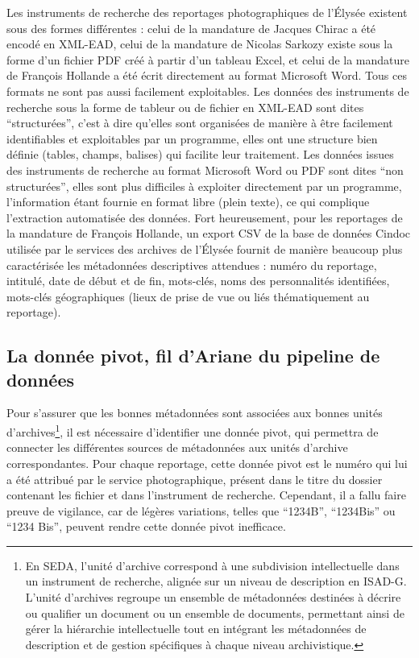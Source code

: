 Les instruments de recherche des reportages photographiques de l'Élysée existent sous des formes différentes : celui de la mandature de Jacques Chirac a été encodé en XML-EAD, celui de la mandature de Nicolas Sarkozy existe sous la forme d'un fichier PDF créé à partir d'un tableau Excel, et celui de la mandature de François Hollande a été écrit directement au format Microsoft Word. Tous ces formats ne sont pas aussi facilement exploitables. Les données des instruments de recherche sous la forme de tableur ou de fichier en XML-EAD sont dites \enquote{structurées}, c'est à dire qu'elles sont organisées de manière à être facilement identifiables et exploitables par un programme, elles ont une structure bien définie (tables, champs, balises) qui facilite leur traitement. Les données issues des instruments de recherche au format Microsoft Word ou PDF sont dites \enquote{non structurées}, elles sont plus difficiles à exploiter directement par un programme, l'information étant fournie en format libre (plein texte), ce qui complique l'extraction automatisée des données. Fort heureusement, pour les reportages de la mandature de François Hollande, un export CSV de la base de données Cindoc utilisée par le services des archives de l'Élysée fournit de manière beaucoup plus caractérisée les métadonnées descriptives attendues : numéro du reportage, intitulé, date de début et de fin, mots-clés, noms des personnalités identifiées, mots-clés géographiques (lieux de prise de vue ou liés thématiquement au reportage).

\subsection*{La donnée pivot, fil d'Ariane du pipeline de données}
Pour s'assurer que les bonnes métadonnées sont associées aux bonnes unités d'archives\footnote{En SEDA, l'unité d'archive correspond à une subdivision intellectuelle dans un instrument de recherche, alignée sur un niveau de description en ISAD-G. L'unité d'archives regroupe un ensemble de métadonnées destinées à décrire ou qualifier un document ou un ensemble de documents, permettant ainsi de gérer la hiérarchie intellectuelle tout en intégrant les métadonnées de description et de gestion spécifiques à chaque niveau archivistique.}, il est nécessaire d'identifier une donnée pivot, qui permettra de connecter les différentes sources de métadonnées aux unités d'archive correspondantes. Pour chaque reportage, cette donnée pivot est le numéro qui lui a été attribué par le service photographique, présent dans le titre du dossier contenant les fichier et dans l'instrument de recherche. Cependant, il a fallu faire preuve de vigilance, car de légères variations, telles que \enquote{1234B}, \enquote{1234Bis} ou \enquote{1234 Bis}, peuvent rendre cette donnée pivot inefficace.

